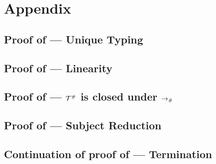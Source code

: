 \chapter{Appendix}

\section{Proof of  --- Unique Typing}
\label{unique_typing_proof}


\section{Proof of  --- Linearity}
\label{linearity_proof}


\section{Proof of  --- $\mathcal{T}^{\mathtt{\#}}$ is closed under $\mathrel{\to_{\mathtt{\#}}}$}
\label{closed_under_arrow_proof}


\section{Proof of  --- Subject Reduction}
\label{subject_reduction_proof}


\section{Continuation of proof of  --- Termination}
\label{termination_proof}



